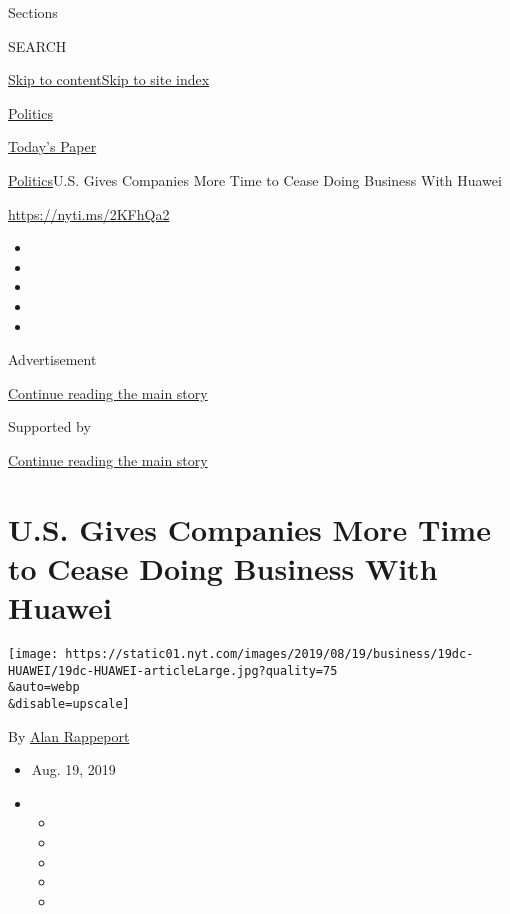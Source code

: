 Sections

SEARCH

\protect\hyperlink{site-content}{Skip to
content}\protect\hyperlink{site-index}{Skip to site index}

\href{https://www.nytimes.com/section/politics}{Politics}

\href{https://myaccount.nytimes.com/auth/login?response_type=cookie\&client_id=vi}{}

\href{https://www.nytimes.com/section/todayspaper}{Today's Paper}

\href{/section/politics}{Politics}\textbar{}U.S. Gives Companies More
Time to Cease Doing Business With Huawei

\url{https://nyti.ms/2KFhQa2}

\begin{itemize}
\item
\item
\item
\item
\item
\end{itemize}

Advertisement

\protect\hyperlink{after-top}{Continue reading the main story}

Supported by

\protect\hyperlink{after-sponsor}{Continue reading the main story}

\hypertarget{us-gives-companies-more-time-to-cease-doing-business-with-huawei}{%
\section{U.S. Gives Companies More Time to Cease Doing Business With
Huawei}\label{us-gives-companies-more-time-to-cease-doing-business-with-huawei}}

\texttt{[image: https://static01.nyt.com/images/2019/08/19/business/19dc-HUAWEI/19dc-HUAWEI-articleLarge.jpg?quality=75\\\&auto=webp\\\&disable=upscale]}

By \href{https://www.nytimes.com/by/alan-rappeport}{Alan Rappeport}

\begin{itemize}
\item
  Aug. 19, 2019
\item
  \begin{itemize}
  \item
  \item
  \item
  \item
  \item
  \end{itemize}
\end{itemize}

